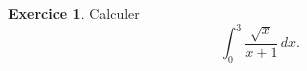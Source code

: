 \documentclass[a4paper, 11pt,openany]{article}%
\theoremstyle{plain}
\theoremstyle{definition}
\newtheorem{exo}{Exercice}
\newtheorem{sol}{Solution de l'exercice}
\theoremstyle{remark}
\begin{document}


\begin{exo}
Calculer
\[ \int_0^3 \frac{\sqrt{x}}{x +1} \, dx.\]
\end{exo}

\end{document}
